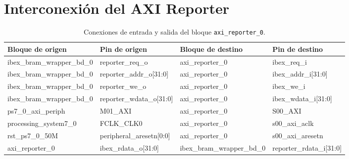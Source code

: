 \section{Interconexión del AXI Reporter}
\begin{table}[!ht]
    \centering
    \caption{Conexiones de entrada y salida del bloque \texttt{axi\_reporter\_0}.}
    \label{tab:ibex_bram-reporter}
    \begin{tabular}{|l|l|l|l|}
    \hline
        Bloque de origen            & Pin de origen                 & Bloque de destino & Pin de destino        \\ \hline
        ibex\_bram\_wrapper\_bd\_0  & reporter\_req\_o              & axi\_reporter\_0  & ibex\_req\_i          \\ \hline
        ibex\_bram\_wrapper\_bd\_0  & reporter\_addr\_o[31:0]       & axi\_reporter\_0  & ibex\_addr\_i[31:0]   \\ \hline
        ibex\_bram\_wrapper\_bd\_0  & reporter\_we\_o               & axi\_reporter\_0  & ibex\_we\_i           \\ \hline
        ibex\_bram\_wrapper\_bd\_0  & reporter\_wdata\_o[31:0]      & axi\_reporter\_0  & ibex\_wdata\_i[31:0]  \\ \hline
        ps7\_0\_axi\_periph         & M01\_AXI                      & axi\_reporter\_0  & S00\_AXI              \\ \hline
        processing\_system7\_0      & FCLK\_CLK0                    & axi\_reporter\_0  & s00\_axi\_aclk        \\ \hline
        rst\_ps7\_0\_50M            & peripheral\_aresetn[0:0]      & axi\_reporter\_0  & s00\_axi\_aresetn     \\ \hline
        axi\_reporter\_0            & ibex\_rdata\_o[31:0]          & ibex\_bram\_wrapper\_bd\_0 & reporter\_rdata\_i[31:0] \\ \hline
    \end{tabular}
\end{table}

